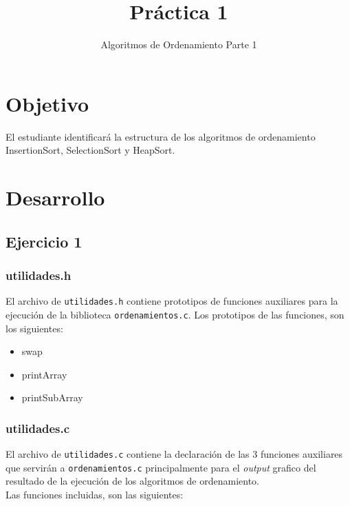\documentclass{article}
\title{Práctica 1}
\author{Algoritmos de Ordenamiento Parte 1}
\begin{document}
	
	\maketitle
	
	\section{Objetivo}
	El estudiante identificará la estructura de los algoritmos de ordenamiento InsertionSort, SelectionSort y HeapSort.
	
	\section{Desarrollo}
		
		\subsection{Ejercicio 1}
		
		
			\subsubsection{utilidades.h}
			
			El archivo de \verb*|utilidades.h| contiene prototipos de funciones auxiliares para la ejecución de la biblioteca \verb*|ordenamientos.c|. Los prototipos de las funciones, son los siguientes:
			
			\begin{itemize}
				\item swap
				\item printArray
				\item printSubArray
			\end{itemize}
			
			\subsubsection{utilidades.c}
			
			El archivo de \verb*|utilidades.c| contiene la declaración de las 3 funciones auxiliares que servirán a \verb*|ordenamientos.c| principalmente para el \emph{output} grafico del resultado de la ejecución de los algoritmos de ordenamiento.\\
			
			Las funciones incluidas, son las siguientes:
			
\end{document}

